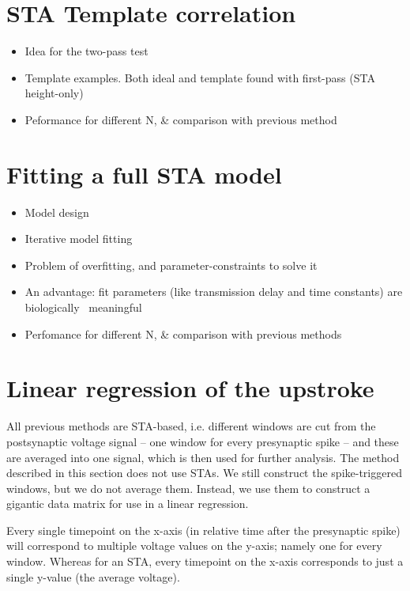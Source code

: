 


\section{STA Template correlation}

\begin{itemize}
    \item Idea for the two-pass test
    \item Template examples. Both ideal and template found with first-pass (STA height-only)
    \item Peformance for different N, \& comparison with previous method
\end{itemize}



\section{Fitting a full STA model}

\begin{itemize}
    \item Model design
    \item Iterative model fitting
    \item Problem of overfitting, and parameter-constraints to solve it
    \item An advantage: fit parameters (like transmission delay and time constants) are biologically ~meaningful
    \item Perfomance for different N, \& comparison with previous methods
\end{itemize}


\section{Linear regression of the upstroke}

All previous methods are STA-based, i.e. different windows are cut from the postsynaptic voltage signal -- one window for every presynaptic spike -- and these are averaged into one signal, which is then used for further analysis. The method described in this section does not use STAs. We still construct the spike-triggered windows, but we do not average them. Instead, we use them to construct a gigantic data matrix for use in a linear regression.

Every single timepoint on the x-axis (in relative time after the presynaptic spike) will correspond to multiple voltage values on the y-axis; namely one for every window. Whereas for an STA, every timepoint on the x-axis corresponds to just a single y-value (the average voltage).


